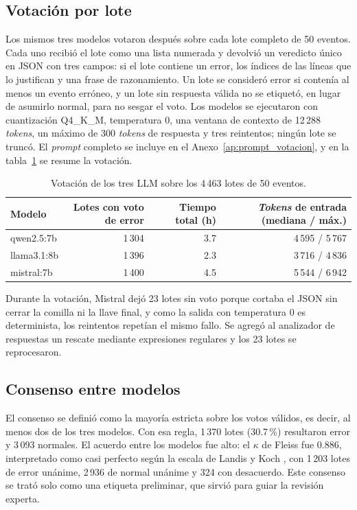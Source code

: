 \subsection{Votación por lote}\label{subsec:met_votacion}

Los mismos tres modelos votaron después sobre cada lote completo de 50 eventos. Cada uno recibió el lote como una lista numerada y devolvió un veredicto único en JSON con tres campos: si el lote contiene un error, los índices de las líneas que lo justifican y una frase de razonamiento. Un lote se consideró error si contenía al menos un evento erróneo, y un lote sin respuesta válida no se etiquetó, en lugar de asumirlo normal, para no sesgar el voto. Los modelos se ejecutaron con cuantización Q4\_K\_M, temperatura 0, una ventana de contexto de 12\,288 \textit{tokens}, un máximo de 300 \textit{tokens} de respuesta y tres reintentos; ningún lote se truncó. El \textit{prompt} completo se incluye en el Anexo~\ref{ap:prompt_votacion}, y en la tabla~\ref{tab:met_votos} se resume la votación.

\begin{table}[H]
\centering
\caption{Votación de los tres LLM sobre los 4\,463 lotes de 50 eventos.}
\label{tab:met_votos}
\small
\begin{tabular}{@{}lrrr@{}}
\toprule
\textbf{Modelo} & \textbf{Lotes con voto de error} & \textbf{Tiempo total (h)} & \textbf{\textit{Tokens} de entrada (mediana / máx.)} \\
\midrule
qwen2.5:7b & 1\,304 & 3.7 & 4\,595 / 5\,767 \\
llama3.1:8b & 1\,396 & 2.3 & 3\,716 / 4\,836 \\
mistral:7b & 1\,400 & 4.5 & 5\,544 / 6\,942 \\
\bottomrule
\end{tabular}
\normalsize
\end{table}

Durante la votación, Mistral dejó 23 lotes sin voto porque cortaba el JSON sin cerrar la comilla ni la llave final, y como la salida con temperatura 0 es determinista, los reintentos repetían el mismo fallo. Se agregó al analizador de respuestas un rescate mediante expresiones regulares y los 23 lotes se reprocesaron.

\subsection{Consenso entre modelos}\label{subsec:met_kappa}

El consenso se definió como la mayoría estricta sobre los votos válidos, es decir, al menos dos de los tres modelos. Con esa regla, 1\,370 lotes (30.7\,\%) resultaron error y 3\,093 normales. El acuerdo entre los modelos fue alto: el $\kappa$ de Fleiss fue 0.886, interpretado como casi perfecto según la escala de Landis y Koch \cite{landis1977_kappa}, con 1\,203 lotes de error unánime, 2\,936 de normal unánime y 324 con desacuerdo. Este consenso se trató solo como una etiqueta preliminar, que sirvió para guiar la revisión experta.


